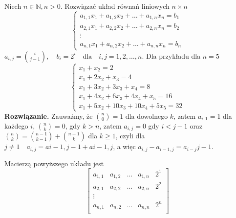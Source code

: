 \documentclass[]{sinol}
\begin{document}
    \begin{zadanie}
        

    Niech $n \in \mathbb{N}, n > 0$. Rozwiązać układ równań liniowych $n \times n$
    \[
       \begin{cases}
            a_{1,1}x_1 + a_{1,2}x_2 + \dots + a_{1,n}x_n = b_1 \\
            a_{2,1}x_1 + a_{2,2}x_2 + \dots + a_{2,n}x_n = b_2 \\
            \vdots \\
            a_{n,1}x_1 + a_{n,2}x_2 + \dots + a_{n,n}x_n = b_n
        \end{cases}
    \]
    \( a_{i,j} = \binom{i}{j-1}, \quad b_i = 2^i \quad \text{dla} \quad i,j = 1,2,\dots,n.\)
    Dla przykładu dla $n = 5$
    \[
    \begin{cases}
        x_1 + x_2 = 2 \\
        x_1 + 2x_2 + x_3 = 4 \\
        x_1 + 3x_2 + 3x_3 + x_4 = 8 \\
        x_1 + 4x_2 + 6x_3 + 4x_4 + x_5 = 16 \\
        x_1 + 5x_2 + 10x_3 + 10x_4 + 5x_5 = 32
    \end{cases}
    \]
    \textbf{Rozwiązanie.}
        Zauważmy, że $\binom{n}{0} = 1$ dla dowolnego $k$, zatem $a_{i, 1} = 1$ dla każdego $i$, $\binom{n}{k} = 0$, gdy $k > n$, zatem $a_{i,j} = 0$ gdy $i < j-1$ oraz $\binom{n}{k} = \binom{n-1}{k-1}+\binom{n-1}{k}$ dla $k \geq 1$, czyli dla $j \neq 1 \quad  a_{i,j}=a{i-1,j-1}+a{i-1, j}$, a więc $a_{i,j}-a_{i-1, j} = a_{i-j}{j-1}$.

        Macierzą powyższego układu jest 
        \[
         \begin{bmatrix}
            a_{1,1} & a_{1,2} & \dots & a_{1,n} & 2^1 \\
            a_{2,1} & a_{2,2} & \dots & a_{2,n} & 2^2 \\
            \vdots \\
            a_{n,1} & a_{n,2} & \dots & a_{n,n} & 2^n \\
        \end{bmatrix}
        \]


\end{zadanie}
\end{document}
